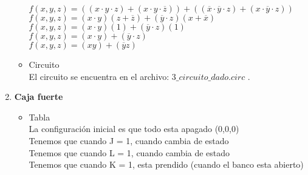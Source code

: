 \documentclass[12pt]{article}
\begin{document}
\begin{enumerate}
\begin{itemize}
  			$f(x,y,z) = ((x\cdot y\cdot z) + (x\cdot y\cdot \overline{z})) + ((\overline{x}\cdot \overline{y}\cdot z) + (x\cdot \overline{y}\cdot z))$ \\
  			$f(x,y,z) = (x\cdot y)(z+\overline{z}) + (\overline{y}\cdot z)(x+\overline{x})$ \\
  			$f(x,y,z) = (x\cdot y)(1) + (\overline{y}\cdot z)(1)$ \\
  			$f(x,y,z) = (x\cdot y) + (\overline{y}\cdot z)$ \\
  			$f(x,y,z) = (xy) + (\overline{y}z)$ 
  		\item Circuito \\
  			El circuito se encuentra en el archivo: $3\_circuito\_dado.circ$ .
  	\end{itemize}
  \item {\bf Caja fuerte}
  	\begin{itemize}
  		\item Tabla \\
  			La configuración inicial es que todo esta apagado (0,0,0) \\
  			Tenemos que cuando J = 1, cuando cambia de estado \\
  			Tenemos que cuando L = 1, cuando cambia de estado \\
  			Tenemos que cuando K = 1, esta prendido (cuando el banco esta abierto)\\
  			

\end{itemize}
\end{enumerate}
\end{document}
